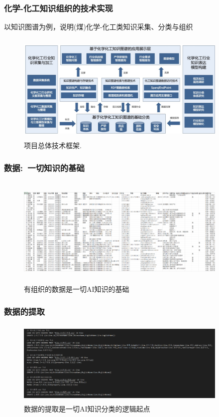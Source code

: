 \begin{frame}
	\frametitle{化学-化工知识组织的技术实现}
	以知识图谱为例，说明(煤)化学-化工类知识采集、分类与组织
\begin{figure}[h!]
\centering
\includegraphics[height=2.08in,width=4.00in,viewport=0 0 245 113,clip]{Figures/KG_Chem-Frame.png}
\caption{\tiny 项目总体技术框架.}%
\label{KG_Chem-Frame}
\end{figure}
\end{frame}

\begin{frame}
	\frametitle{数据:~一切知识的基础}
\begin{figure}[h!]
\centering
\vskip -8pt
\includegraphics[height=2.10in,width=4.00in,viewport=0 0 210 95,clip]{Figures/KG_Chem-Info.png}
\caption{\tiny 有组织的数据是一切\textrm{AI}知识的基础}%
\label{Fig:KG_Chem-Enflurane}
\end{figure}
\end{frame}

\begin{frame}
	\frametitle{数据的提取}
\begin{figure}[h!]
\centering
\includegraphics[height=1.60in,width=4.00in,viewport=0 0 210 80,clip]{Figures/KG_Chem-extract.png}
\caption{\tiny 数据的提取是一切\textrm{AI}知识分类的逻辑起点}%
\label{Fig:KG_Chem-Extract}
\end{figure}
\end{frame}

